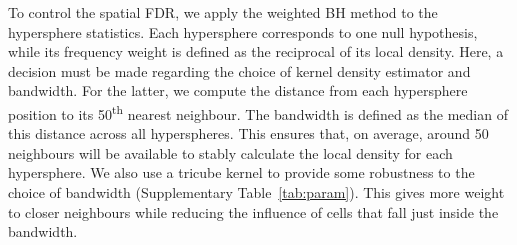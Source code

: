\documentclass{article}
\begin{document}
To control the spatial FDR, we apply the weighted BH method to the hypersphere statistics.
Each hypersphere corresponds to one null hypothesis, while its frequency weight is defined as the reciprocal of its local density.
Here, a decision must be made regarding the choice of kernel density estimator and bandwidth.
For the latter, we compute the distance from each hypersphere position to its 50\textsuperscript{th} nearest neighbour.
The bandwidth is defined as the median of this distance across all hyperspheres.
This ensures that, on average, around 50 neighbours will be available to stably calculate the local density for each hypersphere.
We also use a tricube kernel to provide some robustness to the choice of bandwidth (Supplementary Table~\ref{tab:param}).
This gives more weight to closer neighbours while reducing the influence of cells that fall just inside the bandwidth.
\end{document}
